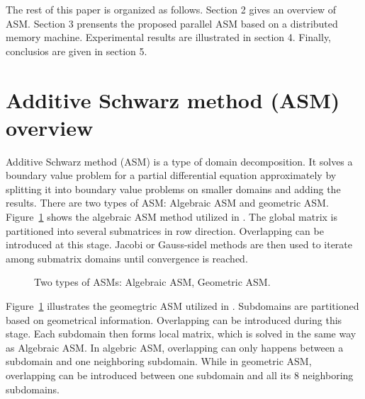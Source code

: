 \documentclass{sig-alternate}
\begin{document}
	The rest of this paper is organized as follows. Section 2 gives an overview of ASM. Section 3 prensents 
	the proposed parallel ASM based on a distributed memory machine. Experimental results are illustrated in section 4. 
	Finally, conclusios are given in section 5.

\section{Additive Schwarz method (ASM) overview}	
	Additive Schwarz method (ASM) is a type of domain decomposition. It solves a boundary value problem for a partial 
	differential equation approximately by splitting it into boundary value problems on smaller domains and adding the results.
	There are two types of ASM: Algebraic ASM and geometric ASM. 
	Figure~\ref{Fig2} shows the algebraic ASM method utilized in \cite{kaisun}. The global matrix
	is partitioned into several submatrices in row direction. 
	Overlapping can be introduced at this stage. Jacobi or Gauss-sidel methods are then used to iterate among submatrix domains until 
	convergence is reached.
	\begin{figure}[htbp]
	  \caption{Two types of ASMs: 
	   Algebraic ASM,
	   Geometric ASM.}
	  \label{Fig2}
	\end{figure}
	Figure~\ref{Fig2} illustrates the geomegtric ASM utilized in \cite{Zhongyu}. Subdomains are partitioned based on
	geometrical information. Overlapping can be introduced during this stage. Each subdomain then forms local matrix, which is
	solved in the same way as Algebraic ASM.
	In algebric ASM, overlapping can only happens between a subdomain and one neighboring subdomain. While in 
	geometric ASM, overlapping can be introduced between one subdomain and all its 8 neighboring subdomains.
	
\end{document}
